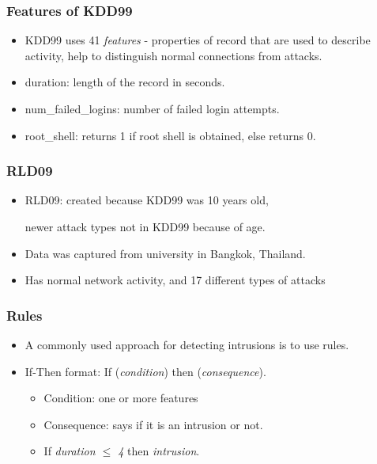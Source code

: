 \documentclass{beamer}
\newcommand{\linespace}{\vskip 0.25cm}
\begin{document}
\begin{frame}
  \frametitle{Features of KDD99}
	\begin{itemize}
		\item KDD99 uses 41 \emph{features} - properties of record that are used to describe activity, help to distinguish normal connections from attacks.
		
		\linespace
		\linespace
		
		\item duration: length of the record in seconds.
		\item num\_failed\_logins: number of failed login attempts.
		\item root\_shell: returns 1 if root shell is obtained, else returns 0.
	\end{itemize}
\end{frame}



\begin{frame}
  \frametitle{RLD09}
	\begin{itemize}
		\item RLD09: created because KDD99 was 10 years old, 
		
		newer attack types not in KDD99 because of age.
		\item Data was captured from university in Bangkok, Thailand.
		\item Has normal network activity, and 17 different types of attacks
	\end{itemize}
\end{frame}



\begin{frame}
  \frametitle{Rules}
	\begin{itemize}
		\item A commonly used approach for detecting intrusions is to use rules.
		\item If-Then format: If (\emph{condition}) then (\emph{consequence}).
		\begin{itemize}
			\item Condition: one or more features
			\item Consequence: says if it is an intrusion or not.
			\linespace
			\item If \emph{duration $\leq$ 4} then \emph{intrusion}.
		\end{itemize}				
	\end{itemize}
\end{frame}
\end{document}
